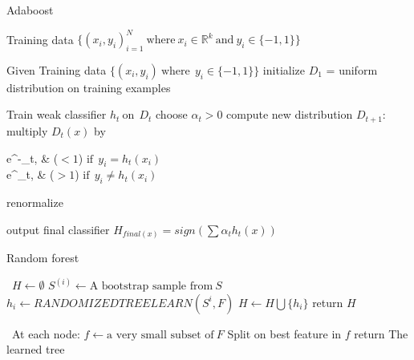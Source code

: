 \documentclass[a4paper]{article}
\begin{document}
  \begin{algorithm}
   \caption{Adaboost ~\cite{adaboostsecond}}
    \begin{algorithmic}[1]
    \INPUT 
    \Statex Training data $\{(x_i,y_i)_{i=1}^N \ \text{where}\ x_i \in  \mathbb{R}^k \ \text{and} \  y_i \in \{-1,1\} \}$
   
    \State Given Training data $\{(x_i,y_i) \ \text{where}\  \  y_i \in \{-1,1\} \}$
    \State initialize $D_1$ = uniform distribution on training examples
   
            \State Train weak classifier $h_t \  \text{on}\   \   D_t $
            \State choose $\alpha_t > 0 $
            \State compute new distribution $D_{t+1}$:
              \State multiply $D_t(x)$ by \begin{numcases}{}
  e^{-\alpha_t}, &  ($<1$) $ \text{if}\  \  y_i = h_t(x_i) $\\
   e^{\alpha_t}, & ($>1$) $ \text{if}\  \  y_i \neq h_t(x_i) $
\end{numcases}
\State renormalize
         \EndFor 
         
  \State output final classifier $H_{final(x)} = sign (\sum\alpha_t h_t(x))$
            
        
        
         
        
        \EndFor
        
       


\end{algorithmic}
\end{algorithm}

  


  \begin{algorithm}
   \caption{Random forest ~\cite{randomforest1}}
    \begin{algorithmic}[1]
      \
      \State $H \leftarrow  \emptyset $
            \State $S^{(i)}\leftarrow \text{A bootstrap sample from} \  S $
            \State $h_i \leftarrow RANDOMIZEDTREELEARN(S^{i},F)$
            \State $H \leftarrow H \bigcup \{h_i\}$
        \EndFor
        \State return $H$
        
        
         



 \EndFunction

  \ 
  \State At each node:
  \State $f \leftarrow \text{a very small subset of} \ F $
  \State Split on best feature in $f$
  \State return The learned tree
   \EndFunction

\end{algorithmic}
\end{algorithm}
\end{document}
